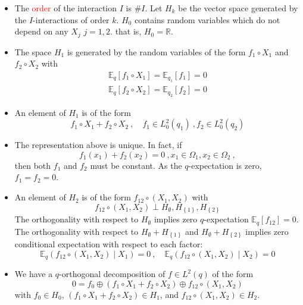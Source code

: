 \documentclass[xcolor=svgnames]{beamer}
\newcommand{\condexpat}[3]{\mathbb E_{#1}\left(#2 \middle| #3\right)}
\newcommand{\expectat}[2]{\mathbb E_{#1}\left[#2\right]}
\newcommand{\reals}{\mathbb{R}}
\newcommand{\rosso}[1]{\textcolor{red}{#1}}
\newcommand{\set}[1]{\left\{#1\right\}}
\renewcommand{\emph}{\rosso}
\begin{document}
\begin{frame}
\begin{itemize}
    \item The \emph{order} of the interaction $I$ is $\# I$. Let $H_k$ be the vector space generated by the $I$-interactions of order $k$. $H_0$ contains random variables which do not depend on any $X_j$ $j=1,2$. that is, $H_0 = \reals$.
    \item The space $H_1$ is generated by the random variables of the form 
        $f_1\circ X_1$ and $f_2\circ X_2$
    with 
    \begin{gather*}
        \expectat q {f_1\circ X_1} = \expectat {q_1} {f_1} = 0 \\
           \expectat q {f_2\circ X_2} = \expectat {q_2} {f_2} = 0 
    \end{gather*}
   \item An element of $H_1$ is of the form
   \begin{equation*}
       f_1\circ X_1 + f_2 \circ X_2 \ , \quad f_1 \in L^2_0(q_1) \ , f_2 \in L^2_0(q_2)
   \end{equation*}
   \item The representation above is unique. In fact, if
   \begin{equation*}
       f_1(x_1) + f_2(x_2) = 0 \ , x_1 \in \Omega_1, x_2 \in \Omega_2 \ ,
   \end{equation*}
   then both $f_1$ and $f_2$ must be constant. As the $q$-expectation is zero, $f_1 = f_2 = 0$.
   \item An element of $H_2$ is of the form $f_{12} \circ(X_1,X_2)$ with
   \begin{equation*}
     f_{12} \circ(X_1,X_2) \perp H_{\emptyset}, H_{\set{1}}, H_{\set{2}}  
   \end{equation*}
   The orthogonality with respect to $H_{\emptyset}$ implies zero $q$-expectation $\expectat q {f_{12}} = 0$. The orthogonality with respect to $H_{\emptyset} + H_{\set{1}}$ and $H_{\emptyset} + H_{\set{2}}$ implies zero conditional expectation with respect to each factor:
   \begin{equation*}
       \condexpat {q} {f_{12} \circ (X_1,X_2)}{X_1} = 0 \ , \quad \condexpat {q} {f_{12} \circ (X_1,X_2)}{X_2} = 0
   \end{equation*}
    \item We have a $q$-orthogonal decomposition of $f \in L^2(q)$ of the form
    \begin{equation*}
    0 = f_0 \oplus (f_1\circ X_1 + f_2\circ X_2) \oplus f_{12}\circ (X_1,X_2)
    \end{equation*}
    with $f_0 \in H_0$, $(f_1\circ X_1 + f_2\circ X_2) \in H_1$, and $f_{12}\circ (X_1,X_2) \in H_2$. 

\end{itemize}
\end{frame}
\end{document}
